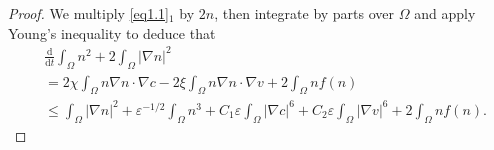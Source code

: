 \documentclass[10pt,a4paper]{amsart}
\numberwithin{equation}{section}
\begin{document}
\begin{proof} 
We multiply \eqref{eq1.1}$_1$ by $2n$, then integrate by parts over $\Omega$ and 
apply Young's inequality to deduce that
\begin{equation}\label{eq-3.34}
\begin{aligned}
&\frac{\mathrm{d}}{\mathrm{d}t} \int_{\Omega} n^2 
+ 2\int_{\Omega} | \nabla n |^2
\\
&=2\chi \int_{\Omega} n \nabla n \cdot \nabla c - 2\xi \int_{\Omega} n \nabla n \cdot \nabla v + 2\int_{\Omega} n f(n)\\&\leq \int_{\Omega} |\nabla
n|^2 +\varepsilon^{-1/2}\int_{\Omega} n^3
+ C_1\varepsilon\int_{\Omega} |\nabla c|^6 
+ C_2\varepsilon\int_{\Omega} |\nabla v|^6+ 2\int_{\Omega} nf(n).
\end{aligned}
\end{equation}


\end{proof}
\end{document}
